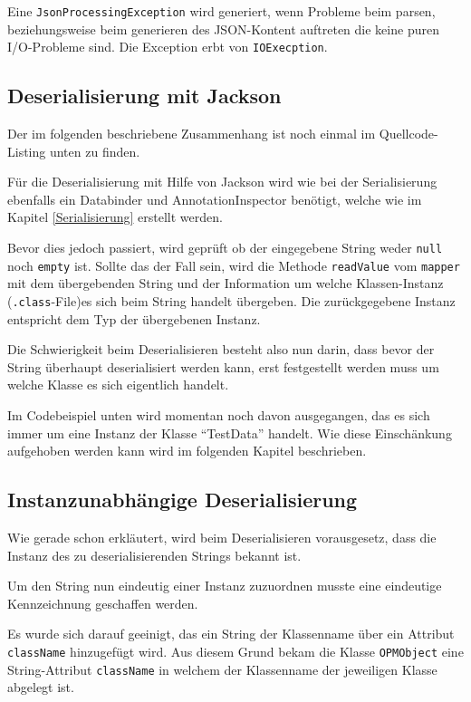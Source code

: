 Eine \texttt{JsonProcessingException} wird generiert, wenn Probleme beim parsen, beziehungsweise beim generieren des JSON-Kontent auftreten die keine puren I/O-Probleme sind. Die Exception erbt von \texttt{IOExecption}.



\newpage
\subsection{Deserialisierung mit Jackson}
Der im folgenden beschriebene Zusammenhang ist noch einmal im Quellcode-Listing unten zu finden.

F\"ur die Deserialisierung mit Hilfe von Jackson wird wie bei der Serialisierung ebenfalls ein Databinder und AnnotationInspector ben\"otigt, welche wie im Kapitel \ref{Serialisierung} erstellt werden. 

Bevor dies jedoch passiert, wird gepr\"uft ob der eingegebene String weder \texttt{null} noch \texttt{empty} ist. 
Sollte das der Fall sein, wird die Methode \texttt{readValue} vom \texttt{mapper} mit dem \"ubergebenden String und der Information um welche Klassen-Instanz (\texttt{.class}-File)es sich beim String handelt \"ubergeben. Die zur\"uckgegebene Instanz entspricht dem Typ der \"ubergebenen Instanz.

Die Schwierigkeit beim Deserialisieren besteht also nun darin, dass bevor der String \"uberhaupt deserialisiert werden kann, erst festgestellt werden muss um welche Klasse es sich eigentlich handelt.

Im Codebeispiel unten wird momentan noch davon ausgegangen, das es sich immer um eine Instanz der Klasse "`TestData"' handelt. Wie diese Einsch\"ankung aufgehoben werden kann wird im folgenden Kapitel beschrieben.



\subsection{Instanzunabh\"angige Deserialisierung}
Wie gerade schon erkl\"autert, wird beim Deserialisieren vorausgesetz, dass die Instanz des zu deserialisierenden Strings bekannt ist.

Um den String nun eindeutig einer Instanz zuzuordnen musste eine eindeutige Kennzeichnung geschaffen werden.

Es wurde sich darauf geeinigt, das ein String der Klassenname \"uber ein Attribut \texttt{className} hinzugef\"ugt wird. Aus diesem Grund bekam die Klasse \texttt{OPMObject} eine String-Attribut \texttt{className} in welchem der Klassenname der jeweiligen Klasse abgelegt ist.

